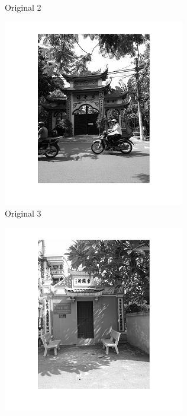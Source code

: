 \begin{center}
\begin{figure}[h]
\begin{subfigure}[b]{0.18\textwidth}
                \caption{Original 2}
                \label{fig:original 2}
        \end{subfigure}%
        \begin{subfigure}[b]{0.18\textwidth}
                \includegraphics[width=\linewidth]{pagoda3.png}
                 \caption{Original 3}
                  \label{fig:original 3}
        \end{subfigure}%
        \begin{subfigure}[b]{0.18\textwidth}
                \includegraphics[width=\linewidth]{pagoda4.png}

\end{subfigure}
\end{figure}
\end{center}
